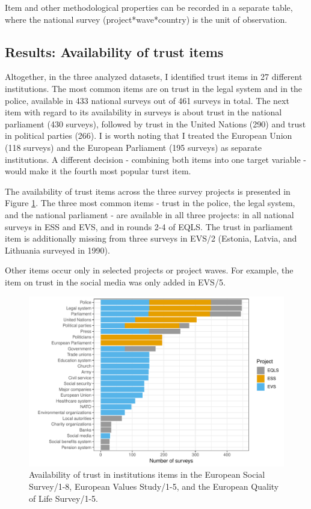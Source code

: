\documentclass[12pt,]{article}
\begin{document}
Item and other methodological properties can be recorded in a separate table, where the national survey (project*wave*country) is the unit of observation.

\hypertarget{results-availability-of-trust-items}{%
\subsection{Results: Availability of trust items}\label{results-availability-of-trust-items}}

Altogether, in the three analyzed datasets, I identified trust items in 27 different institutions. The most common items are on trust in the legal system and in the police, available in 433 national surveys out of 461 surveys in total. The next item with regard to its availability in surveys is about trust in the national parliament (430 surveys), followed by trust in the United Nations (290) and trust in political parties (266). I is worth noting that I treated the European Union (118 surveys) and the European Parliament (195 surveys) as separate institutions. A different decision - combining both items into one target variable - would make it the fourth most popular turst item.

The availability of trust items across the three survey projects is presented in Figure \ref{fig:trust-availability}. The three most common items - trust in the police, the legal system, and the national parliament - are available in all three projects: in all national surveys in ESS and EVS, and in rounds 2-4 of EQLS. The trust in parliament item is additionally missing from three surveys in EVS/2 (Estonia, Latvia, and Lithuania surveyed in 1990).

Other items occur only in selected projects or project waves. For example, the item on trust in the social media was only added in EVS/5.

\begin{figure}
\centering
\includegraphics{Harmonization_working_paper_files/figure-latex/trust-availability-1.pdf}
\caption{\label{fig:trust-availability}Availability of trust in institutions items in the European Social Survey/1-8, European Values Study/1-5, and the European Quality of Life Survey/1-5.}
\end{figure}
\end{document}

